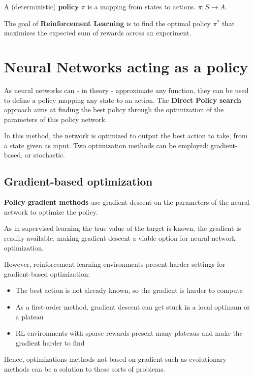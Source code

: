 A (deterministic) \textbf{policy} $\pi$ is a mapping from states to actions. $\pi: S \longrightarrow A$.

The goal of \textbf{Reinforcement Learning} is to find the optimal policy $\pi^*$ that maximizes the expected sum of rewards across an experiment. 

\section{Neural Networks acting as a policy}

As neural networks \cite{perceptron} can - in theory - approximate any function, they can be used to define a policy mapping any state to an action. The \textbf{Direct Policy search} approach aims at finding the best policy through the optimization of the parameters of this policy network.

In this method, the network is optimized to output the best action to take, from a state given as input. Two optimization methods can be employed: gradient-based, or stochastic.

\subsection{Gradient-based optimization}

\textbf{Policy gradient methods} use gradient descent \cite{sgd} on the parameters of the neural network to optimize the policy. 

As in supervised learning the true value of the target is known, the gradient is readily available, making gradient descent a viable option for neural network optimization. 

However, reinforcement learning environments present harder settings for gradient-based optimization:

\begin{itemize}
    \item The best action is not already known, so the gradient is harder to compute
    \item As a first-order method, gradient descent can get stuck in a local optimum or a plateau
    \item RL environments with sparse rewards present many plateaus and make the gradient harder to find
\end{itemize}

Hence, optimizations methods not based on gradient such as evolutionary methods can be a solution to these sorts of problems.

